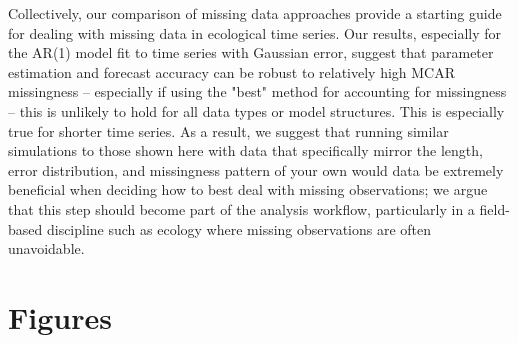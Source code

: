 \documentclass{article}
\begin{document}
Collectively, our comparison of missing data approaches provide a starting guide for dealing with missing data in ecological time series. Our results, especially for the AR(1) model fit to time series with Gaussian error, suggest that parameter estimation and forecast accuracy can be robust to relatively high MCAR missingness -- especially if using the "best" method for accounting for missingness -- this is unlikely to hold for all data types or model structures. This is especially true for shorter time series. As a result, we suggest that running similar simulations to those shown here with data that specifically mirror the length, error distribution, and missingness pattern of your own would data be extremely beneficial when deciding how to best deal with missing observations; we argue that this step should become part of the analysis workflow, particularly in a field-based discipline such as ecology where missing observations are often unavoidable. %




\newpage


\section*{Figures}
\end{document}
